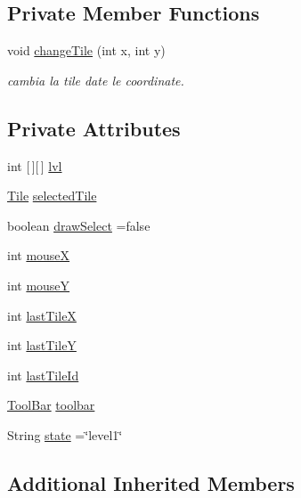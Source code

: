 \subsection*{Private Member Functions}
\begin{DoxyCompactItemize}
\item 
void \hyperlink{classscenes_1_1_editing_afbbb0a60fd2d899ff81c1715fce5fc73}{change\+Tile} (int x, int y)
\begin{DoxyCompactList}\small\item\em cambia la tile date le coordinate. \end{DoxyCompactList}\end{DoxyCompactItemize}
\subsection*{Private Attributes}
\begin{DoxyCompactItemize}
\item 
int \mbox{[}$\,$\mbox{]}\mbox{[}$\,$\mbox{]} \hyperlink{classscenes_1_1_editing_a4b06a2210cf5b93dda77f2a9a061d538}{lvl}
\item 
\hyperlink{classobjects_1_1_tile}{Tile} \hyperlink{classscenes_1_1_editing_a57de6d93afd033cf117e53aec7cf844a}{selected\+Tile}
\item 
boolean \hyperlink{classscenes_1_1_editing_a8d5ef14629eeeeb8a4a1bc8454a62704}{draw\+Select} =false
\item 
int \hyperlink{classscenes_1_1_editing_a85ea1b63086b31a15d3ed2579c5715a6}{mouseX}
\item 
int \hyperlink{classscenes_1_1_editing_a3637abebcaa9d04aa18b1610d0921e16}{mouseY}
\item 
int \hyperlink{classscenes_1_1_editing_a70fd9888adca7ad0959f2742a4df47e1}{last\+TileX}
\item 
int \hyperlink{classscenes_1_1_editing_a0247c714fa7743b7e0c0dcd2b3266c6b}{last\+TileY}
\item 
int \hyperlink{classscenes_1_1_editing_a3d7a822288189aaede4848ba3f139fb7}{last\+Tile\+Id}
\item 
\hyperlink{classui_1_1_tool_bar}{Tool\+Bar} \hyperlink{classscenes_1_1_editing_a2da79d490f532bdeeaee3eb967fabb13}{toolbar}
\item 
String \hyperlink{classscenes_1_1_editing_a91ac952876f776b3fbbc8519e093fdbf}{state} =\char`\"{}level1\char`\"{}
\end{DoxyCompactItemize}
\subsection*{Additional Inherited Members}


